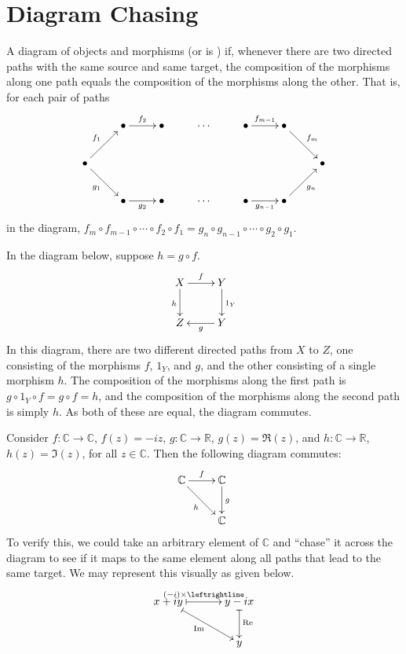 \section{Diagram Chasing}\label{sec:DiagramChasing}

A diagram of objects and morphisms  (or is ) if, whenever there are two directed paths with the same source and same target, the composition of the morphisms along one path equals the composition of the morphisms along the other. That is, for each pair of paths
\begin{equation*}
\xymatrix{
& \bullet \ar[r]^{f_2} &  \bullet & \cdots & \bullet \ar[r]^{f_{m-1}} & \bullet \ar[rd]^{f_m} & \\
\bullet \ar[ru]^{f_1} \ar[rd]_{g_1} &&&&&& \bullet \\
& \bullet \ar[r]_{g_2} & \bullet & \cdots & \bullet \ar[r]_{g_{n-1}} & \bullet \ar[ru]_{g_n} &
}
\end{equation*}
in the diagram, $f_m \circ f_{m-1} \circ \cdots \circ f_2 \circ f_1 = g_n \circ g_{n-1} \circ \cdots \circ g_2 \circ g_1$.

\begin{Example} In the diagram below, suppose $h = g \circ f$.
\begin{equation*}
\xymatrix{
X \ar[r]^f \ar[d]_h & Y \ar[d]^{1_Y} \\
Z & Y \ar[l]^g
}
\end{equation*}
In this diagram, there are two different directed paths from $X$ to $Z$, one consisting of the morphisms $f$, $1_Y$, and $g$, and the other consisting of a single morphism $h$. The composition of the morphisms along the first path is $g \circ 1_Y \circ f = g \circ f = h$, and the composition of the morphisms along the second path is simply $h$. As both of these are equal, the diagram commutes.
\end{Example}

\begin{Example}
Consider $f \colon \mathbb C \to \mathbb C$, $f(z) = -iz$, $g \colon \mathbb C \to \mathbb R$, $g(z) = \Re(z)$, and $h \colon \mathbb C \to \mathbb R$, $h(z) = \Im(z)$, for all $z \in \mathbb C$. Then the following diagram commutes:
\begin{equation*}
\xymatrix{
\mathbb C \ar[r]^f \ar[rd]_h & \mathbb C \ar[d]^g \\
& \mathbb C
}
\end{equation*}
To verify this, we could take an arbitrary element of $\mathbb C$ and ``chase'' it across the diagram to see if it maps to the same element along all paths that lead to the same target. We may represent this visually as given below.
\begin{equation*}
\xymatrix@C=3.2em{
x + iy \ar@{|->}[r]^{(-i) \times \leftrightline} \ar@{|->}[rd]_{\Im} & y - ix \ar@{|->}[d]^{\Re} \\
& y
}
\end{equation*}
\end{Example}


